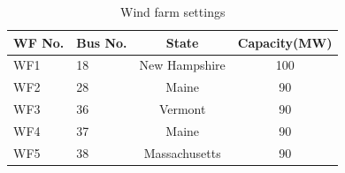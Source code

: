 \begin{table}[ht]
\begin{center}
\caption{Wind farm settings}
\begin{tabular}{|l|l|c|c|}
\hline
WF No. & Bus No. & State & Capacity(MW) \\
\hline
WF1 & 18& New Hampshire & 100\\
WF2 & 28& Maine & 90 \\
WF3 & 36& Vermont & 90  \\
WF4 & 37& Maine & 90\\
WF5 & 38& Massachusetts & 90\\
\hline

\end{tabular}
   \vspace{.05in}
\label{tab:wf_setting}
\end{center}
\end{table}

